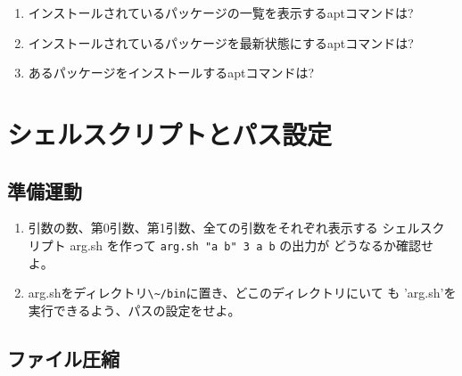 \documentclass[11pt, twocolumn, ]{jsarticle}
\providecommand{\tightlist}{%
   \setlength{\itemsep}{0pt}\setlength{\parskip}{0pt}}
\begin{document}
\begin{enumerate}
\tightlist
\item
  インストールされているパッケージの一覧を表示するaptコマンドは?
\item
  インストールされているパッケージを最新状態にするaptコマンドは?
\item
  あるパッケージをインストールするaptコマンドは?
\end{enumerate}

\hypertarget{ux30b7ux30a7ux30ebux30b9ux30afux30eaux30d7ux30c8ux3068ux30d1ux30b9ux8a2dux5b9a}{%
\section{シェルスクリプトとパス設定}\label{ux30b7ux30a7ux30ebux30b9ux30afux30eaux30d7ux30c8ux3068ux30d1ux30b9ux8a2dux5b9a}}

\hypertarget{ux6e96ux5099ux904bux52d5}{%
\subsection{準備運動}\label{ux6e96ux5099ux904bux52d5}}

\begin{enumerate}
\item
  引数の数、第0引数、第1引数、全ての引数をそれぞれ表示する
  シェルスクリプト arg.sh を作って
  \passthrough{\lstinline!arg.sh "a b" 3 a b!} の出力が
  どうなるか確認せよ。
\item
  arg.shをディレクトリ\passthrough{\lstinline!\~/bin!}に置き、どこのディレクトリにいて
  も 'arg.sh'を実行できるよう、パスの設定をせよ。
\end{enumerate}

\hypertarget{ux30d5ux30a1ux30a4ux30ebux5727ux7e2e}{%
\subsection{ファイル圧縮}\label{ux30d5ux30a1ux30a4ux30ebux5727ux7e2e}}
\end{document}
